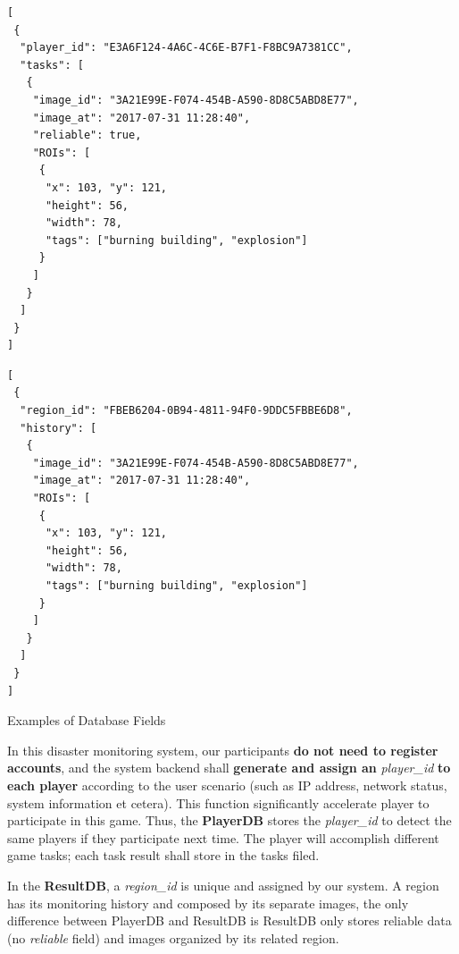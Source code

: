 \begin{listing}[H]
\noindent\begin{minipage}[b]{.45\textwidth}
    \begin{lstlisting}
[
 {
  "player_id": "E3A6F124-4A6C-4C6E-B7F1-F8BC9A7381CC",
  "tasks": [
   {
    "image_id": "3A21E99E-F074-454B-A590-8D8C5ABD8E77",
    "image_at": "2017-07-31 11:28:40",
    "reliable": true,
    "ROIs": [
     {
      "x": 103, "y": 121,
      "height": 56,
      "width": 78,
      "tags": ["burning building", "explosion"]
     }
    ]
   }
  ]
 }
]
    \end{lstlisting}
    \label{lst:playerdb}            
    \end{minipage}%
    \hfill
\begin{minipage}[b]{.45\textwidth}
    \begin{lstlisting}
[
 {
  "region_id": "FBEB6204-0B94-4811-94F0-9DDC5FBBE6D8",
  "history": [
   {
    "image_id": "3A21E99E-F074-454B-A590-8D8C5ABD8E77",
    "image_at": "2017-07-31 11:28:40",
    "ROIs": [
     {
      "x": 103, "y": 121,
      "height": 56,
      "width": 78,
      "tags": ["burning building", "explosion"]
     }
    ]
   }
  ]
 }
]

    \end{lstlisting}
    \label{lst:resultdb}            
\end{minipage}
\addtocounter{listing}{-1}
\caption{Examples of Database Fields}
\label{lst:codeblocks}
\end{listing}

In this disaster monitoring system, our participants \textbf{do not need to register accounts},
and the system backend shall \textbf{generate and assign an} \emph{player\_id} \textbf{to each player} according to 
the user scenario (such as IP address, network status, system information et cetera).
This function significantly accelerate player to participate in this game. 
Thus, the \textbf{PlayerDB} stores the \emph{player\_id} to detect the same players if they participate next time. 
The player will accomplish different game tasks; each task result shall store in the tasks filed.

In the \textbf{ResultDB}, a \emph{region\_id} is unique and assigned by our system. A region has its
monitoring history and composed by its separate images, the only difference between PlayerDB and ResultDB is
ResultDB only stores reliable data (no \emph{reliable} field) and images organized by its related region.

